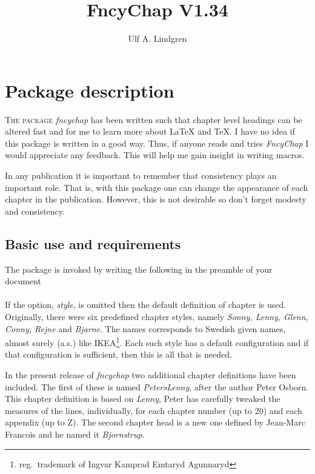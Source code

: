 \documentclass{report}
\title{FncyChap V1.34}
\author{Ulf A. Lindgren}
\date{}
\newcommand{\sk}{\vspace{0.2 cm}}
\newcommand{\A}[1]{{\texttt{\textbackslash #1}}}
\newcommand{\nsp}{\mbox{\hspace{-1 cm}}}
\begin{document}
  \maketitle
  \tableofcontents
  \chapter{Package description}
    \lettrine{T}{he package} \textsl{fncychap} has been written such that
    chapter level headings can be altered fast and for me to learn more
    about \LaTeX{} and \TeX{}. I have no idea if this package is
    written in a good way. Thus, if anyone reads and tries {\em
    FncyChap} I would appreciate any feedback. This will help me gain
    insight in writing macros.
    
    In any publication it is important to remember that consistency
    plays an important role. That is, with this package one can change
    the appearance of each chapter in the publication. However, this is
    not desirable so don't forget modesty and consistency.

    \section{Basic use and requirements}
    The package is invoked by writing the following in the preamble of
    your document\sk\\
    \nsp\fbox{\A{usepackage}\texttt{[}{\em style}\texttt{]\textbraceleft}{\em
    fncychap}\texttt{\textbraceright}}\sk\\
    If the option, {\em style}, is omitted then the default definition
    of chapter is used. Originally, there were six predefined chapter styles,
    namely {\em Sonny, Lenny, Glenn, Conny, Rejne} and {\em Bjarne}.
    The names corresponds to Swedish given names, almost surely (a.s.) like
    IKEA\footnote{reg.~trademark of Ingvar Kamprad Emtaryd
    Agunnaryd}. Each such style has a default configuration and if
    that configuration is sufficient, then this is all that is needed.
    
    In the present release of \textsl{fncychap} two additional chapter
    definitions have been included. The first of these is named {\em
    PetersLenny}, after the author Peter Osborn. This chapter
    definition is based on {\em Lenny}, Peter has carefully tweaked the
    measures of the lines, individually, for each chapter number (up to 20)
    and each appendix (up to Z). The second chapter head is a new one
    defined by Jean-Marc Francois and he named it \textsl{Bjornstrup}.
\end{document}
